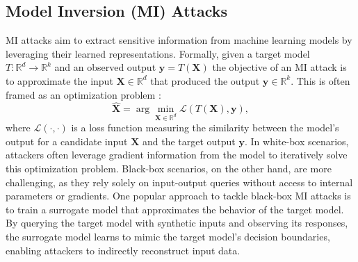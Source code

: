 
\subsection{Model Inversion (MI) Attacks}

\noindent
MI attacks aim to extract sensitive information from machine learning models by leveraging their learned representations. Formally, given a target model $T: \mathbb{R}^d \to \mathbb{R}^k$ and an observed output $\mathbf{y} = T(\mathbf{X})$ the objective of an MI attack is to approximate the input  $\mathbf{X} \in \mathbb{R}^d$ that produced the output $\mathbf{y} \in \mathbb{R}^k$. This is often framed as an optimization problem \cite{struppek2022plug}:
\begin{equation}
\hat{\mathbf{X}} = \arg\min_{\mathbf{X} \in \mathbb{R}^d} \mathcal{L}(T(\mathbf{X}), \mathbf{y}),
\label{eq:MI-opt}
\end{equation}
where $\mathcal{L}(\cdot, \cdot)$ is a loss function measuring the similarity between the model’s output for a candidate input $\mathbf{X}$ and the target output $\mathbf{y}$. In white-box scenarios, attackers often leverage gradient information from the model to iteratively solve this optimization problem. Black-box scenarios, on the other hand, are more challenging, as they rely solely on input-output queries without access to internal parameters or gradients. 
One popular approach to tackle black-box MI attacks is to train a surrogate model that approximates the behavior of the target model. By querying the target model with synthetic inputs and observing its responses, the surrogate model learns to mimic the target model’s decision boundaries, enabling attackers to indirectly reconstruct input  data\cite{fang2024privacy}.
